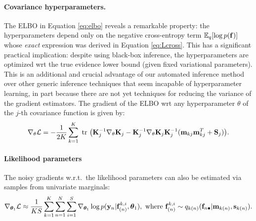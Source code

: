 \paragraph{Covariance hyperparameters.}
The ELBO  in Equation \eqref{eq:elbo} reveals a remarkable property: the hyperparameters depend only on
the negative cross-entropy term $\mathbb{E}_q  [\log p(\mathbf{f})]$ whose \textit{exact} expression was derived in 
Equation \eqref{eq:Lcross}. 
This has a  significant practical implication: despite using black-box inference,  the hyperparameters are optimized wrt the true evidence lower bound (given fixed variational parameters). 
This is an additional and crucial advantage of our automated inference method 
over other generic inference techniques  \cite{ranganath2014black} 
that seem incapable of hyperparameter learning, in part because 
there are not yet techniques for reducing the variance of the gradient estimators.
The gradient of the ELBO wrt any hyperparameter  $\theta$ of the $j$-th covariance function is given by: 
\newcommand{\Kjinv}{\K_j^{-1}}
\begin{align}
\nabla_{\theta} \calL = -\frac{1}{2K} \sum_{k=1}^K \trace \big(\Kjinv \nabla_{\theta} \K_j -  \Kjinv \nabla_{\theta} \K_j \Kjinv (\m_{kj} \m_{kj}^T + \S_j) \big).
\end{align}

%

\paragraph{Likelihood parameters}
The noisy gradients w.r.t.~the likelihood parameters can also be estimated via samples from univariate marginals:
\newcommand{\gtheta}[1]{\nabla_{\vtheta{#1}}}
\begin{align}
\gtheta{1} \calL 
\approx \frac{1}{KS} \sum_{k=1}^K \sum_{n=1}^N  \sum_{i=1}^S \gtheta{1} \log p(\y_n | \f^{k,i}_{(n)},  \vtheta{1}), \text{ where } \f^{k,i}_{(n)} \sim q_{k(n)} (\fn | \mkn, \skn).
\end{align}

